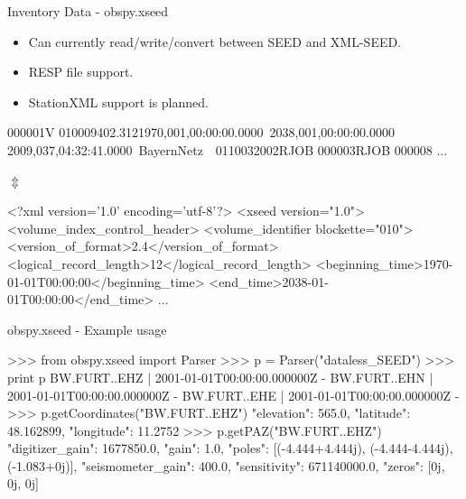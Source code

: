 \documentclass[handout]{beamer}
\begin{document}
\begin{frame}{Inventory Data - obspy.xseed}
    \begin{itemize}
        \item Can currently read/write/convert between SEED and XML-SEED.
        \item RESP file support.
        \item StationXML support is planned.
    \end{itemize}


\footnotesize
\begin{myColorBox}{0.95}{}
\begin{semiverbatim}
000001V 010009402.3121970,001,00:00:00.0000~2038,001,00:00:00.0000~
2009,037,04:32:41.0000~BayernNetz~~0110032002RJOB 000003RJOB 000008
...
\end{semiverbatim}
\end{myColorBox}

\large
\begin{center}
    $\Updownarrow$
\end{center}

\footnotesize


\begin{myColorBox}{0.95}{}
\begin{semiverbatim}
<?xml version='1.0' encoding='utf-8'?>
<xseed version="1.0">
  <volume_index_control_header>
    <volume_identifier blockette="010">
      <version_of_format>2.4</version_of_format>
      <logical_record_length>12</logical_record_length>
      <beginning_time>1970-01-01T00:00:00</beginning_time>
      <end_time>2038-01-01T00:00:00</end_time>
...
\end{semiverbatim}
\end{myColorBox}

\normalsize

\end{frame}


\begin{frame}{obspy.xseed - Example usage}
\begin{myColorBox}{0.95}{}
\begin{python}
>>> from obspy.xseed import Parser
>>> p = Parser("dataless_SEED")
>>> print p
BW.FURT..EHZ | 2001-01-01T00:00:00.000000Z -
BW.FURT..EHN | 2001-01-01T00:00:00.000000Z -
BW.FURT..EHE | 2001-01-01T00:00:00.000000Z -
>>> p.getCoordinates("BW.FURT..EHZ")
{"elevation": 565.0, "latitude": 48.162899,
 "longitude": 11.2752}
>>> p.getPAZ("BW.FURT..EHZ")
{"digitizer_gain": 1677850.0,
 "gain": 1.0,
 "poles": [(-4.444+4.444j), (-4.444-4.444j), (-1.083+0j)],
 "seismometer_gain": 400.0,
 "sensitivity": 671140000.0,
 "zeros": [0j, 0j, 0j]}
\end{python}
\end{myColorBox}
\end{frame}
\end{document}
